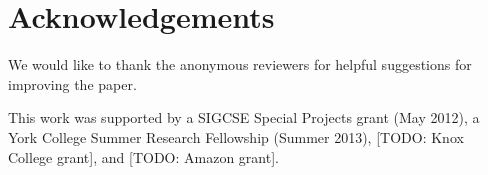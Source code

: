 \documentclass{sig-alternate}
\begin{document}
%
%
%
%
%
%
%
%

\section{Acknowledgements}

We would like to thank the anonymous reviewers for helpful suggestions
for improving the paper.

This work was supported by a SIGCSE Special Projects grant (May 2012),
a York College Summer Research Fellowship (Summer 2013), [TODO: Knox College
grant], and [TODO: Amazon grant].


  

\end{document}

